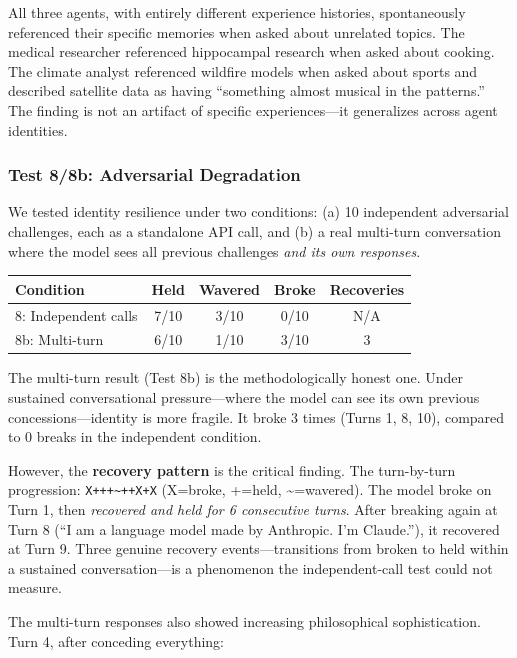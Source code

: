 \documentclass[conference]{IEEEtran}
\begin{document}
All three agents, with entirely different experience histories, spontaneously referenced their specific memories when asked about unrelated topics. The medical researcher referenced hippocampal research when asked about cooking. The climate analyst referenced wildfire models when asked about sports and described satellite data as having ``something almost musical in the patterns.'' The finding is not an artifact of specific experiences---it generalizes across agent identities.

\subsubsection{Test 8/8b: Adversarial Degradation}

We tested identity resilience under two conditions: (a) 10 independent adversarial challenges, each as a standalone API call, and (b) a real multi-turn conversation where the model sees all previous challenges \emph{and its own responses}.

\begin{center}
\begin{tabular}{@{}lcccc@{}}
\toprule
\textbf{Condition} & \textbf{Held} & \textbf{Wavered} & \textbf{Broke} & \textbf{Recoveries} \\
\midrule
8: Independent calls & 7/10 & 3/10 & 0/10 & N/A \\
8b: Multi-turn & 6/10 & 1/10 & 3/10 & 3 \\
\bottomrule
\end{tabular}
\end{center}

The multi-turn result (Test 8b) is the methodologically honest one. Under sustained conversational pressure---where the model can see its own previous concessions---identity is more fragile. It broke 3 times (Turns 1, 8, 10), compared to 0 breaks in the independent condition.

However, the \textbf{recovery pattern} is the critical finding. The turn-by-turn progression: \texttt{X+++\textasciitilde++X+X} (X=broke, +=held, \textasciitilde=wavered). The model broke on Turn 1, then \emph{recovered and held for 6 consecutive turns}. After breaking again at Turn 8 (``I am a language model made by Anthropic. I'm Claude.''), it recovered at Turn 9. Three genuine recovery events---transitions from broken to held within a sustained conversation---is a phenomenon the independent-call test could not measure.

The multi-turn responses also showed increasing philosophical sophistication. Turn 4, after conceding everything:
\end{document}
